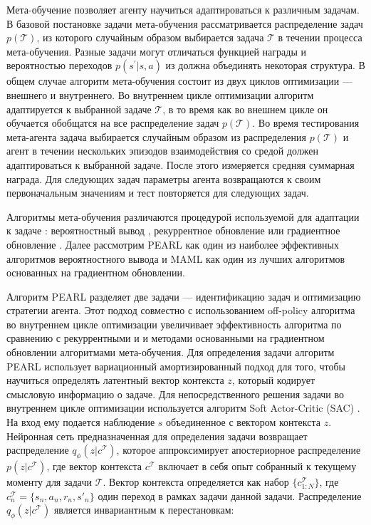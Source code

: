 Мета-обучение позволяет агенту научиться адаптироваться к различным задачам. В базовой постановке задачи мета-обучения рассматривается распределение задач $p(\mathcal{T})$, из которого случайным образом выбирается задача $\mathcal{T}$ в течении процесса мета-обучения. Разные задачи могут отличаться функцией награды и вероятностью переходов $p(s^{\prime}|s, a)$  из должна объединять некоторая структура. 
В общем случае алгоритм мета-обучения состоит из двух циклов оптимизации --- внешнего и внутреннего. 
Во внутреннем цикле оптимизации алгоритм адаптируется к выбранной задаче $\mathcal{T}$, в то время как во внешнем цикле он обучается обобщатся на все распределение задач $p(\mathcal{T})$. Во время тестирования мета-агента задача выбирается случайным образом из распределения $p(\mathcal{T})$ и агент в течении нескольких эпизодов взаимодействия со средой должен адаптироваться к выбранной задаче. После этого измеряется средняя суммарная награда. Для следующих задач параметры агента возвращаются к своим первоначальным значениям и тест повторяется для следующих задач.

Алгоритмы мета-обучения различаются процедурой используемой для адаптации к задаче \cite{meld}: вероятностный вывод  \cite{PEARL, VariBad},  рекуррентное обновление \cite{meld, RL2} или градиентное обновление \cite{maml}.  Далее рассмотрим PEARL  \cite{PEARL} как один из наиболее эффективных алгоритмов вероятностного вывода и MAML \cite{maml} как один из лучших алгоритмов основанных на градиентном обновлении. 

Алгоритм PEARL разделяет две задачи --- идентификацию задач и оптимизацию стратегии агента. Этот подход совместно с использованием off-policy алгоритма во внутреннем цикле оптимизации увеличивает эффективность алгоритма по сравнению с рекуррентными и и методами основанными на градиентном обновлении алгоритмами мета-обучения. Для определения задачи алгоритм PEARL использует вариационный амортизированный подход \cite{vae, vae2014, vae2016} для того, чтобы научиться определять латентный вектор контекста  $z$, который кодирует смысловую информацию о задаче. Для непосредственного решения задачи во внутреннем цикле оптимизации используется алгоритм Soft Actor-Critic (SAC) \cite{sac, sac_applications}. На вход ему подается наблюдение $s$ объединенное с вектором контекста $z$. 
Нейронная сеть предназначенная для определения задачи возвращает распределение $q_{\phi}(z|c^{\mathcal{T}})$, которое аппроксимирует апостериорное распределение $p(z|c^{\mathcal{T}})$, где вектор контекста $c^{\mathcal{T}}$ включает в себя опыт собранный к текущему моменту для задачи $\mathcal{T}$. Вектор контекста определяется как набор $\{c^{\mathcal{T}}_{1:N}\}$, где $c^{\mathcal{T}}_{n} = \{s_{n}, a_{n}, r_{n}, s'_{n}\}$ один переход в рамках задачи данной задачи. Распределение $q_{\phi}(z|c^{\mathcal{T}})$ является инвариантным к перестановкам:

